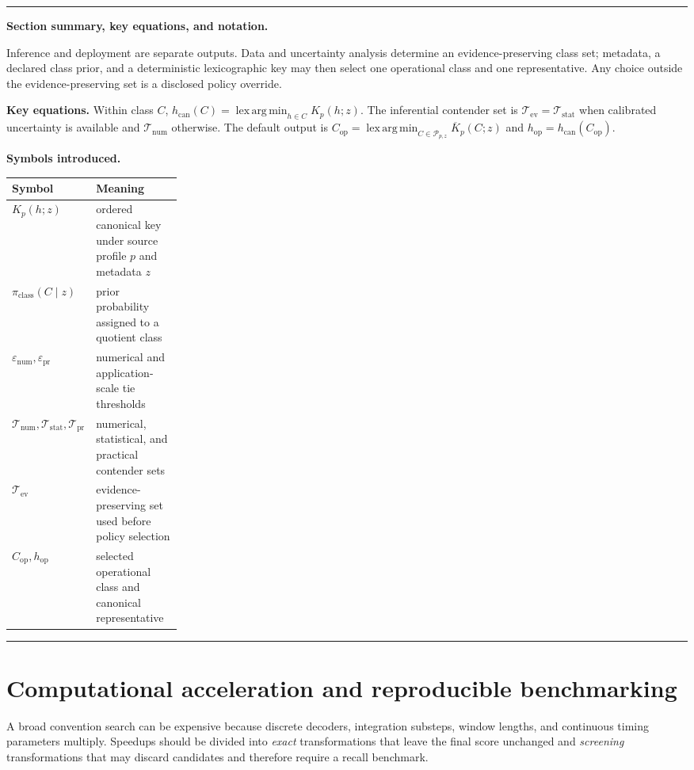 \documentclass[11pt]{article}
\newcommand{\lexargmin}{\operatorname*{lex\,arg\,min}}
\newenvironment{sectionrecap}
{\par\medskip\begingroup\small\noindent\rule{\linewidth}{0.4pt}\par
\smallskip\noindent\textbf{Section summary, key equations, and notation.}\par\smallskip}
{\par\smallskip\noindent\rule{\linewidth}{0.4pt}\par\endgroup\medskip}
\begin{document}
    \begin{sectionrecap}
        Inference and deployment are separate outputs. Data and uncertainty analysis determine
        an evidence-preserving class set; metadata, a declared class prior, and a deterministic
        lexicographic key may then select one operational class and one representative. Any
        choice outside the evidence-preserving set is a disclosed policy override.

        \noindent\textbf{Key equations.}
        Within class $C$, $h_{\mathrm{can}}(C)=\lexargmin_{h\in C}K_p(h;z)$. The inferential
        contender set is $\mathcal T_{\mathrm{ev}}=\mathcal T_{\mathrm{stat}}$ when calibrated
        uncertainty is available and $\mathcal T_{\mathrm{num}}$ otherwise. The default output is
        \(C_{\mathrm{op}}=\lexargmin_{C\in\mathcal P_{p,z}}\overline K_p(C;z)\) and
        $h_{\mathrm{op}}=h_{\mathrm{can}}(C_{\mathrm{op}})$.

        \noindent\textbf{Symbols introduced.}
        \par\noindent\begin{tabularx}{\linewidth}{@{}p{0.25\linewidth}Y@{}}
\toprule
Symbol & Meaning \\
\midrule
$K_p(h;z)$ & ordered canonical key under source profile $p$ and metadata $z$ \\
$\pi_{\mathrm{class}}(C\mid z)$ & prior probability assigned to a quotient class \\
$\varepsilon_{\mathrm{num}},\varepsilon_{\mathrm{pr}}$ & numerical and application-scale tie thresholds \\
$\mathcal T_{\mathrm{num}},\mathcal T_{\mathrm{stat}},\mathcal T_{\mathrm{pr}}$ & numerical, statistical, and practical contender sets \\
$\mathcal T_{\mathrm{ev}}$ & evidence-preserving set used before policy selection \\
$C_{\mathrm{op}},h_{\mathrm{op}}$ & selected operational class and canonical representative \\
\bottomrule
        \end{tabularx}
    \end{sectionrecap}


    \section{Computational acceleration and reproducible benchmarking}\label{app:acceleration}

    A broad convention search can be expensive because discrete decoders, integration
    substeps, window lengths, and continuous timing parameters multiply. Speedups should be
    divided into \emph{exact} transformations that leave the final score unchanged and
    \emph{screening} transformations that may discard candidates and therefore require a
    recall benchmark.
\end{document}
